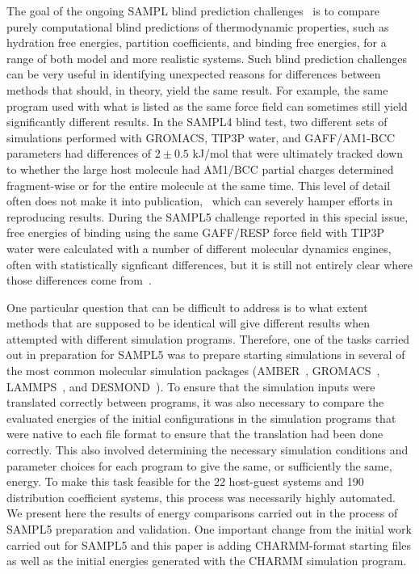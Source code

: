 The goal of the ongoing SAMPL blind prediction
challenges~\citep{Muddana2014SAMPL4,Muddana2012a,geballe_sampl2_2010,guthrie_blind_2009}
is to compare purely computational blind predictions of thermodynamic
properties, such as hydration free energies, partition coefficients,
and binding free energies, for a range of both model and more
realistic systems. Such blind prediction challenges can be very useful
in identifying unexpected reasons for differences between methods that
should, in theory, yield the same result. For example, the same
program used with what is listed as the same force field can sometimes
still yield significantly different results. In the SAMPL4 blind test,
two different sets of simulations performed with GROMACS, TIP3P water,
and GAFF/AM1-BCC parameters had differences of $2 \pm 0.5$ kJ/mol that
were ultimately tracked down to whether the large host molecule had
AM1/BCC partial charges determined fragment-wise or for the entire
molecule at the same time. This level of detail often does not make it
into publication,~\citep{Monroe2014} which can severely hamper efforts
in reproducing results. During the SAMPL5 challenge reported in this
special issue, free energies of binding using the same GAFF/RESP force
field with TIP3P water were calculated with a number of different
molecular dynamics engines, often with statistically signficant
differences, but it is still not entirely clear where those
differences come from~\citep{SAMPL5Overview}.

One particular question that can be difficult to address is to what
extent methods that are supposed to be identical will give different
results when attempted with different simulation programs.  Therefore,
one of the tasks carried out in preparation for SAMPL5 was to prepare
starting simulations in several of the most common molecular
simulation packages (AMBER~\citep{Amber14},
GROMACS~\citep{hess_gromacs_2008}, LAMMPS~\citep{plimpton_fast_1995},
and DESMOND~\citep{bowers_scalable_2006}). To ensure that the
simulation inputs were translated correctly between programs, it was
also necessary to compare the evaluated energies of the initial
configurations in the simulation programs that were native to each
file format to ensure that the translation had been done correctly.
This also involved determining the necessary simulation conditions and
parameter choices for each program to give the same, or sufficiently
the same, energy.  To make this task feasible for the 22 host-guest
systems and 190 distribution coefficient systems, this process was
necessarily highly automated. We present here the results of energy
comparisons carried out in the process of SAMPL5 preparation and
validation.  One important change from the initial work carried out
for SAMPL5 and this paper is adding CHARMM-format starting files as
well as the initial energies generated with the CHARMM simulation
program.

